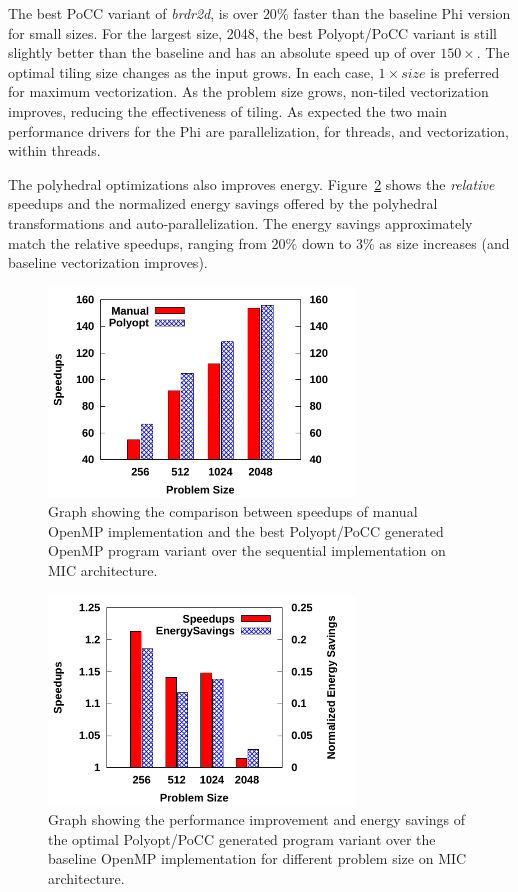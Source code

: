 The best PoCC variant of \emph{brdr2d}, is over $20\%$ faster than the baseline Phi version for small sizes.
For the largest size, 2048, the best Polyopt/PoCC variant is still slightly better than the
baseline and has an absolute speed up of over $150\times$.
The optimal tiling size changes as the input grows. In each case, $1\times size$
is preferred for maximum vectorization. As the problem size grows, non-tiled
vectorization improves, reducing the effectiveness of tiling.
As expected the two main performance drivers for the Phi are 
parallelization, for threads, and vectorization, within threads.

The polyhedral optimizations also improves energy. Figure~\ref{fig:MIC-speedup} shows the \emph{relative} speedups and the
normalized energy savings offered by the polyhedral transformations and auto-parallelization.
The energy savings approximately match the relative speedups, ranging from $20\%$
down to $3\%$ as size increases (and baseline vectorization improves).
\begin{figure}[bt]
    \includegraphics[width=3.2in]{Speedup-over-sequential}
    \caption{Graph showing the comparison between speedups of manual OpenMP implementation and the best
Polyopt/PoCC generated OpenMP program variant over the sequential implementation on MIC architecture.}
    \label{fig:MIC-speedup-over-seq}
\end{figure}
\begin{figure}[bt]
    \includegraphics[width=3.2in]{MIC-Speedups}
    \caption{Graph showing the performance improvement and energy savings of 
the optimal Polyopt/PoCC generated program variant over the baseline OpenMP implementation for different problem size on
MIC architecture.}
    \label{fig:MIC-speedup}
\end{figure}
